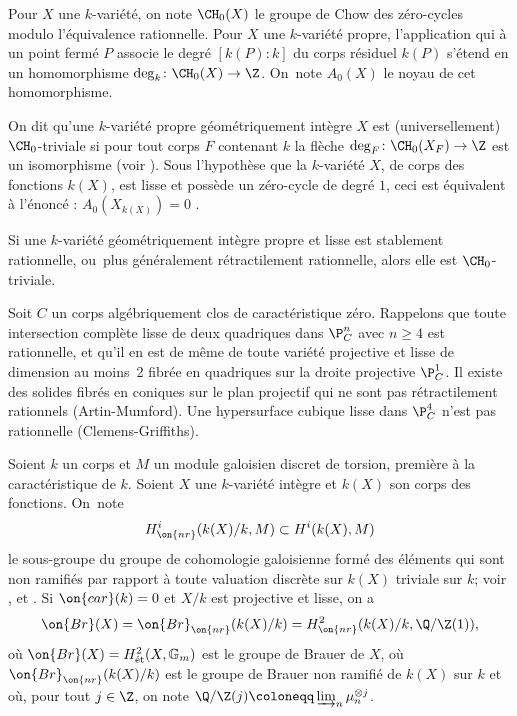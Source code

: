 \medskip

Pour $X$ une $k$-variété, on note $\CH_{0}(X)$ le groupe de Chow des zéro-cycles modulo l'équivalence rationnelle.
Pour $X$ une $k$-variété propre, l'application qui à un point fermé $P$
associe le degré $[k(P):k]$ du corps résiduel $k(P)$ s'étend en un homomorphisme
$ \mathrm{deg}_{k} \colon \CH_{0}(X) \to \Z$. On~note $A_{0}(X)$ le noyau de cet homomorphisme.

On dit qu'une $k$-variété propre géométriquement intègre $X$ est (universellement) $\CH_{0}$-triviale si pour tout corps $F$ contenant $k$
la flèche $ \mathrm{deg}_{F} \colon \CH_{0}(X_{F}) \to \Z$ est un isomorphisme
(voir \cite{auel2017universal, colliot2016hypersurfaces}).
Sous l'hypothèse que la $k$-variété $X$, de corps des fonctions $k(X)$, est lisse et
possède un zéro-cycle de degré $1$, ceci est équivalent à l'énoncé : $A_{0}(X_{k(X)})=0$ \cite[Lem.\,1.3]{auel2017universal}.

Si une $k$-variété géométriquement intègre propre et lisse est stablement rationnelle, ou~plus généralement rétractilement rationnelle, alors elle est $\CH_{0}$-triviale.

Soit $C$ un corps algébriquement clos de caractéristique zéro.
Rappelons que toute intersection complète lisse de deux quadriques dans $\P^n_C$ avec $n \geq 4$ est rationnelle,
et qu'il en est de même de toute variété projective et lisse de dimension au moins~2 fibrée en quadriques sur la droite projective $\P^1_C$. Il existe des solides fibrés en coniques sur le plan projectif qui ne sont pas rétractilement rationnels (Artin-Mumford).
Une hypersurface cubique lisse dans $\P^4_C$ n'est pas rationnelle (Clemens-Griffiths).

Soient $k$ un corps et $M$ un module galoisien discret de torsion, première à la caractéristique de $k$.
Soient
$X$ une $k$-variété intègre et $k(X)$
son corps des fonctions. On~note \[
H^{i}_{\on{nr}}(k(X)/k, M) \subset H^{i}(k(X),M)
\]
le sous-groupe du groupe de cohomologie galoisienne
formé des éléments qui sont non ramifiés par rapport à toute valuation discrète sur $k(X)$ triviale sur $k$; voir \hbox{\cite[\S 4]{colliot1995birational}}, \cite{rost1996chow} et \cite{merkurjev2008unramified}.
Si $\on{car}(k)=0$ et $X/k$ est projective et lisse, on a
\[\on{Br}(X)=\on{Br}_{\on{nr}}(k(X)/k)=H^2_{\on{nr}}(k(X)/k,\Q/\Z(1)),\]
où $\on{Br}(X)=H^2_{\text{ét}}(X,\mathbb{G}_m)$ est le groupe de Brauer de $X$, où $\on{Br}_{\on{nr}}(k(X)/k)$ est le groupe de Brauer non ramifié de $k(X)$ sur $k$ et où, pour tout $j\in \Z$, on note $\Q/\Z(j)\coloneqq \varinjlim_n \mu_n^{\otimes j}$.

